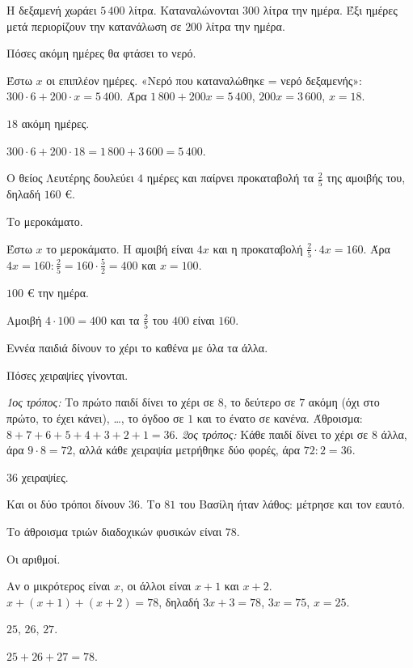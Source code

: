\tixero Η δεξαμενή χωράει $5\,400$ λίτρα. Καταναλώνονται $300$ λίτρα την ημέρα. Έξι ημέρες μετά περιορίζουν την κατανάλωση σε $200$ λίτρα την ημέρα.\par
\tithelo Πόσες ακόμη ημέρες θα φτάσει το νερό.\par
\possindeo Έστω $x$ οι επιπλέον ημέρες. «Νερό που καταναλώθηκε = νερό δεξαμενής»: $300\cdot6+200\cdot x=5\,400$. Άρα $1\,800+200x=5\,400$, $200x=3\,600$, $x=18$.\par
\apantisi $18$ ακόμη ημέρες.\par
\elegxos $300\cdot6+200\cdot18=1\,800+3\,600=5\,400$.

\tixero Ο θείος Λευτέρης δουλεύει $4$ ημέρες και παίρνει προκαταβολή τα $\frac{2}{5}$ της αμοιβής του, δηλαδή $160$ €.\par
\tithelo Το μεροκάματο.\par
\possindeo Έστω $x$ το μεροκάματο. Η αμοιβή είναι $4x$ και η προκαταβολή $\frac{2}{5}\cdot4x=160$. Άρα $4x=160:\frac{2}{5}=160\cdot\frac{5}{2}=400$ και $x=100$.\par
\apantisi $100$ € την ημέρα.\par
\elegxos Αμοιβή $4\cdot100=400$ και τα $\frac{2}{5}$ του $400$ είναι $160$.

\tixero Εννέα παιδιά δίνουν το χέρι το καθένα με όλα τα άλλα.\par
\tithelo Πόσες χειραψίες γίνονται.\par
\possindeo \emph{1ος τρόπος:} Το πρώτο παιδί δίνει το χέρι σε $8$, το δεύτερο σε $7$ ακόμη (όχι στο πρώτο, το έχει κάνει), \dots, το όγδοο σε $1$ και το ένατο σε κανένα. Άθροισμα: $8+7+6+5+4+3+2+1=36$. \emph{2ος τρόπος:} Κάθε παιδί δίνει το χέρι σε $8$ άλλα, άρα $9\cdot8=72$, αλλά κάθε χειραψία μετρήθηκε δύο φορές, άρα $72:2=36$.\par
\apantisi $36$ χειραψίες.\par
\elegxos Και οι δύο τρόποι δίνουν $36$. Το $81$ του Βασίλη ήταν λάθος: μέτρησε και τον εαυτό.

\tixero Το άθροισμα τριών διαδοχικών φυσικών είναι $78$.\par
\tithelo Οι αριθμοί.\par
\possindeo Αν ο μικρότερος είναι $x$, οι άλλοι είναι $x+1$ και $x+2$. $x+(x+1)+(x+2)=78$, δηλαδή $3x+3=78$, $3x=75$, $x=25$.\par
\apantisi $25,\,26,\,27$.\par
\elegxos $25+26+27=78$.

